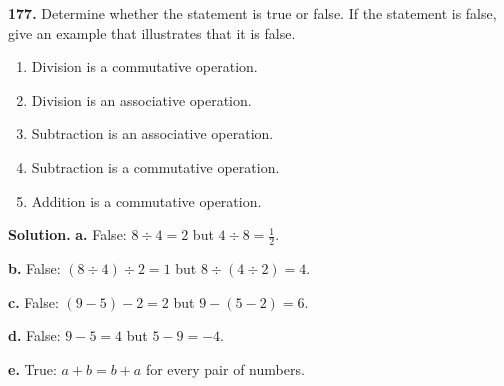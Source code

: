 \documentclass{ximera}
\begin{document}
\begin{problem}
\textbf{177.} Determine whether the statement is true or false. If the statement is false,
  give an example that illustrates that it is false.
  \begin{enumerate}[label=\textbf{\alph*.},leftmargin=2em,topsep=2pt,itemsep=1pt]
    \item Division is a commutative operation.
    \item Division is an associative operation.
    \item Subtraction is an associative operation.
    \item Subtraction is a commutative operation.
    \item Addition is a commutative operation.
  \end{enumerate}

\begin{hint}
\textbf{Solution.} \textbf{a.} False: $8\div 4=2$ but $4\div 8=\tfrac{1}{2}$.

\textbf{b.} False: $(8\div 4)\div 2=1$ but $8\div(4\div 2)=4$.

\textbf{c.} False: $(9-5)-2=2$ but $9-(5-2)=6$.

\textbf{d.} False: $9-5=4$ but $5-9=-4$.

\textbf{e.} True: $a+b=b+a$ for every pair of numbers.
\end{hint}
\end{problem}
\end{document}
